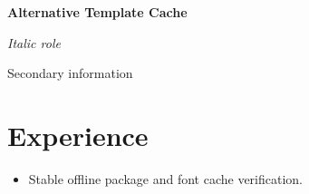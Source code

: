\documentclass[11pt,a4paper]{article}
\begin{document}
{\Huge\bfseries\textcolor{titleblue}{Alternative Template Cache}}\par
\textit{Italic role}\par
{\small Secondary information}\par
\section*{Experience}
\begin{itemize}
  \item Stable offline package and font cache verification.
\end{itemize}
\end{document}
